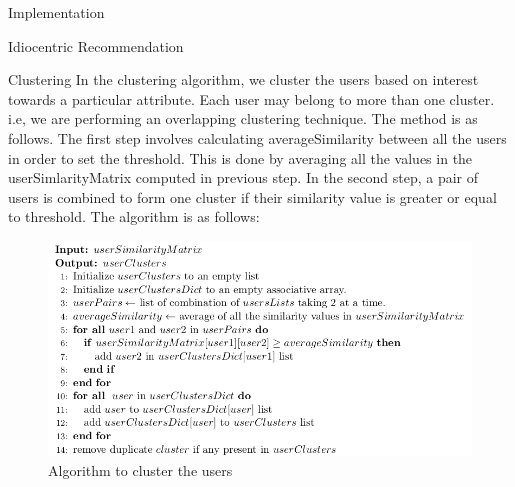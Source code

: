 \documentclass{report}
\begin{document}
\begin{projChapter}{Implementation}
\begin{projSection}{Idiocentric Recommendation}
\end{projSection}
\begin{projSection}{Clustering}
            In the clustering algorithm, we cluster the users based on interest towards a particular attribute. Each user may belong to more than one cluster. i.e, we are performing an overlapping clustering technique. The method is as follows. The first step involves calculating averageSimilarity between all the users in order to set the threshold. This is done by averaging all the values in the userSimlarityMatrix computed in previous step. In the second step, a pair of users is combined to form one cluster if their similarity value is greater or equal to threshold. The algorithm is as follows:
            \begin{figure}[ht!]
\centering
\includegraphics[scale=0.6]{images/clustering.png}
\caption{Algorithm to cluster the users}
\label{clustering}
\end{figure}


\end{projSection}
\end{projChapter}
\end{document}
